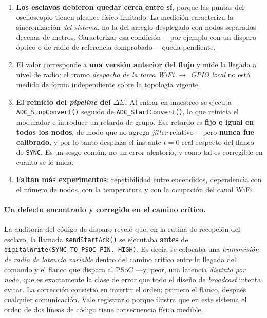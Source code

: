 \begin{enumerate}[itemsep=0.2em]
    \item \textbf{Los esclavos debieron quedar cerca entre s\'i}, porque las puntas del
    osciloscopio tienen alcance f\'isico limitado. La medici\'on caracteriza la
    sincronizaci\'on \emph{del sistema}, no la del arreglo desplegado con nodos separados
    decenas de metros. Caracterizar esa condici\'on ---por ejemplo con un disparo \'optico
    o de radio de referencia comprobado--- queda pendiente.
    \item El valor corresponde a \textbf{una versi\'on anterior del flujo} y mide la
    llegada a nivel de radio; el tramo \emph{despacho de la tarea WiFi $\to$ GPIO local}
    no est\'a medido de forma independiente sobre la topolog\'ia vigente.
    \item \textbf{El reinicio del \emph{pipeline} del $\Delta\Sigma$.} Al entrar en
    muestreo se ejecuta \texttt{ADC\_StopConvert()} seguido de
    \texttt{ADC\_StartConvert()}, lo que reinicia el modulador e introduce un retardo de
    grupo. Ese retardo es \textbf{fijo e igual en todos los nodos}, de modo que no agrega
    \emph{jitter} relativo ---pero \textbf{nunca fue calibrado}, y por lo tanto desplaza
    el instante $t=0$ real respecto del flanco de \texttt{SYNC}. Es un sesgo com\'un, no
    un error aleatorio, y como tal es corregible en cuanto se lo mida.
    \item \textbf{Faltan m\'as experimentos}: repetibilidad entre encendidos, dependencia
    con el n\'umero de nodos, con la temperatura y con la ocupaci\'on del canal WiFi.
\end{enumerate}

\paragraph{Un defecto encontrado y corregido en el camino cr\'itico.} La auditor\'ia del
c\'odigo de disparo revel\'o que, en la rutina de recepci\'on del esclavo, la llamada
\texttt{sendStartAck()} se ejecutaba \textbf{antes} de
\texttt{digitalWrite(SYNC\_TO\_PSOC\_PIN, HIGH)}. Es decir: se colocaba una
\emph{transmisi\'on de radio de latencia variable} dentro del camino cr\'itico entre la
llegada del comando y el flanco que dispara al PSoC ---y, peor, una latencia
\emph{distinta por nodo}, que es exactamente la clase de error que todo el dise\~no de
\emph{broadcast} intenta evitar. La correcci\'on consisti\'o en invertir el orden: primero
el flanco, despu\'es cualquier comunicaci\'on. Vale registrarlo porque ilustra que en este
sistema el orden de dos l\'ineas de c\'odigo tiene consecuencia f\'isica medible.

